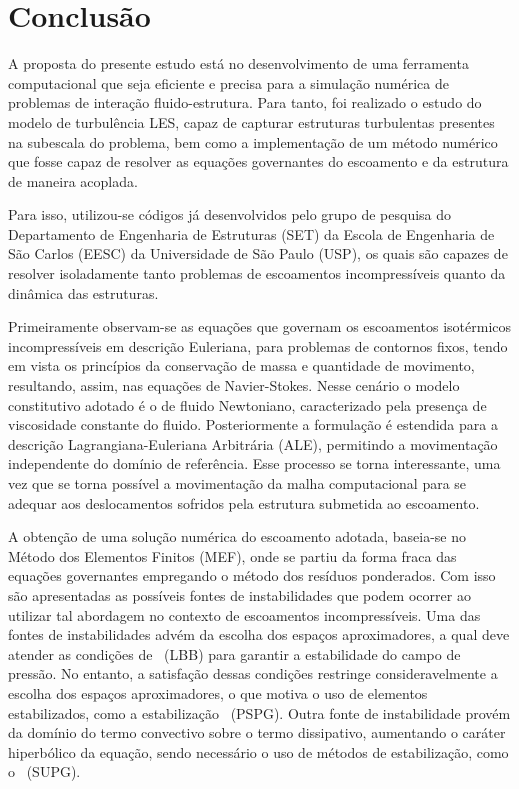 \chapter{Conclusão} \label{Conclusao}

A proposta do presente estudo está no desenvolvimento de uma ferramenta computacional que seja eficiente e precisa para a simulação numérica de problemas de interação fluido-estrutura. Para tanto, foi realizado o estudo do modelo de turbulência LES, capaz de capturar estruturas turbulentas presentes na subescala do problema, bem como a implementação de um método numérico que fosse capaz de resolver as equações governantes do escoamento e da estrutura de maneira acoplada.

Para isso, utilizou-se códigos já desenvolvidos pelo grupo de pesquisa do Departamento de Engenharia de Estruturas (SET) da Escola de Engenharia de São Carlos (EESC) da Universidade de São Paulo (USP), os quais são capazes de resolver isoladamente tanto problemas de escoamentos incompressíveis quanto da dinâmica das estruturas.

Primeiramente observam-se as equações que governam os escoamentos isotérmicos incompressíveis em descrição Euleriana, para problemas de contornos fixos, tendo em vista os princípios da conservação de massa e quantidade de movimento, resultando, assim, nas equações de Navier-Stokes. Nesse cenário o modelo constitutivo adotado é o de fluido Newtoniano, caracterizado pela presença de viscosidade constante do fluido. Posteriormente a formulação é estendida para a descrição Lagrangiana-Euleriana Arbitrária (ALE), permitindo a movimentação independente do domínio de referência. Esse processo se torna interessante, uma vez que se torna possível a movimentação da malha computacional para se adequar aos deslocamentos sofridos pela estrutura submetida ao escoamento.

A obtenção de uma solução numérica do escoamento adotada, baseia-se no Método dos Elementos Finitos (MEF), onde se partiu da forma fraca das equações governantes empregando o método dos resíduos ponderados. Com isso são apresentadas as possíveis fontes de instabilidades que podem ocorrer ao utilizar tal abordagem no contexto de escoamentos incompressíveis. Uma das fontes de instabilidades advém da escolha dos espaços aproximadores, a qual deve atender as condições de \LBB\ (LBB) para garantir a estabilidade do campo de pressão. No entanto, a satisfação dessas condições restringe consideravelmente a escolha dos espaços aproximadores, o que motiva o uso de elementos estabilizados, como a estabilização \PSPG\ (PSPG). Outra fonte de instabilidade provém da domínio do termo convectivo sobre o termo dissipativo, aumentando o caráter hiperbólico da equação, sendo necessário o uso de métodos de estabilização, como o \SUPG\ (SUPG).

